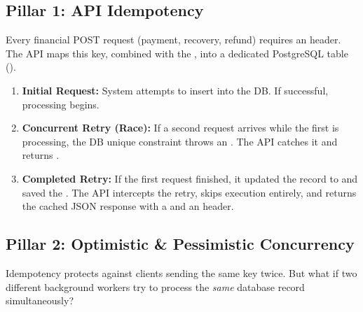 \vspace{0.8cm}

\subsection{Pillar 1: API Idempotency}

Every financial POST request (payment, recovery, refund) requires an  header. The API maps this key, combined with the , into a dedicated PostgreSQL table ().

\begin{tcolorbox}[featurebox={Idempotency Lifecycle}]
\begin{enumerate}
    \item \textbf{Initial Request:} System attempts to insert  into the DB. If successful, processing begins.
    \item \textbf{Concurrent Retry (Race):} If a second request arrives while the first is processing, the DB unique constraint throws an . The API catches it and returns .
    \item \textbf{Completed Retry:} If the first request finished, it updated the record to  and saved the . The API intercepts the retry, skips execution entirely, and returns the cached JSON response with a  and an  header.
\end{enumerate}
\end{tcolorbox}

\vspace{0.8cm}

\subsection{Pillar 2: Optimistic \& Pessimistic Concurrency}

Idempotency protects against clients sending the same key twice. But what if two different background workers try to process the \textit{same} database record simultaneously?

